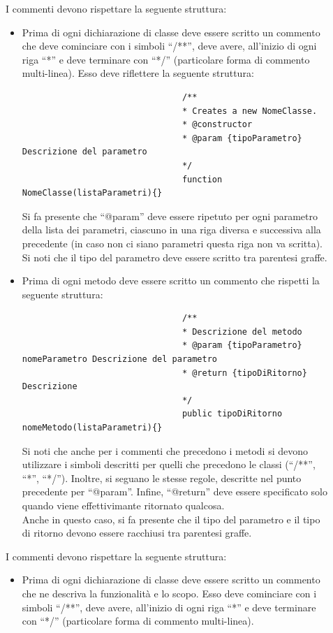 			\begin{description}
					\item[] I commenti devono rispettare la seguente struttura:
						\begin{itemize}
							\item Prima di ogni dichiarazione di classe deve essere scritto un commento che deve cominciare con i simboli “/**”, deve avere, all'inizio di ogni riga “*” e deve terminare con “*/” (particolare forma di commento multi-linea). Esso deve riflettere la seguente struttura:
							\begin{lstlisting} 
								/**
								* Creates a new NomeClasse. 
								* @constructor
								* @param {tipoParametro} Descrizione del parametro 
								*/
								function NomeClasse(listaParametri){}
							\end{lstlisting}
							Si fa presente che “@param” deve essere ripetuto per ogni parametro della lista dei parametri, ciascuno in una riga diversa e successiva alla precedente (in caso non ci siano parametri questa riga non va scritta).\\
							Si noti che il tipo del parametro deve essere scritto tra parentesi graffe.
							\item Prima di ogni metodo deve essere scritto un commento che rispetti la seguente struttura:
							\begin{lstlisting} 
								/**
								* Descrizione del metodo 
								* @param {tipoParametro} nomeParametro Descrizione del parametro
								* @return {tipoDiRitorno} Descrizione 
								*/
								public tipoDiRitorno nomeMetodo(listaParametri){}
							\end{lstlisting}
							Si noti che anche per i commenti che precedono i metodi si devono utilizzare i simboli descritti per quelli che precedono le classi (“/**”, “*”, “*/”). Inoltre, si seguano le stesse regole, descritte nel punto precedente per “@param”. Infine, “@return” deve essere specificato solo quando viene effettivimante ritornato qualcosa. \\
							Anche in questo caso, si fa presente che il tipo del parametro e il tipo di ritorno devono essere racchiusi tra parentesi graffe.
						\end{itemize}
					\item[] I commenti devono rispettare la seguente struttura:
						\begin{itemize}
							\item Prima di ogni dichiarazione di classe deve essere scritto un commento che ne descriva la funzionalità e lo scopo. Esso deve cominciare con i simboli “/**”, deve avere, all'inizio di ogni riga “*” e deve terminare con “*/” (particolare forma di commento multi-linea).

\end{itemize}
\end{description}
